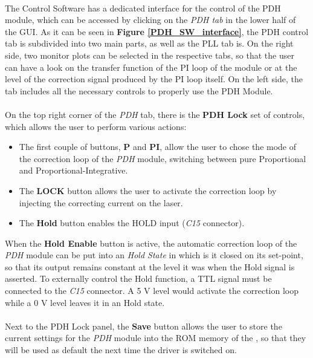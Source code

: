 \paragraph{} The \QubeModel  Control Software has a dedicated interface for the control of the PDH module, which can be accessed by clicking on the \textit{PDH tab} in the lower half of the GUI.
\newline As it can be seen in \textbf{Figure \ref{PDH_SW_interface}}, the PDH control tab is subdivided into two main parts, as well as the PLL tab is. On the right side, two monitor plots can be selected in the respective tabs, so that the user can have a look on the transfer function of the PI loop of the module or at the level of the correction signal produced by the PI loop itself.
\newline On the left side, the tab includes all the necessary controls to properly use the PDH Module.

\paragraph{} On the top right corner of the \textit{PDH} tab, there is the \textbf{PDH Lock} set of controls, which allows the user to perform various actions:
\begin{itemize}
    \item The first couple of buttons, \textbf{P} and \textbf{PI}, allow the user to chose the mode of the correction loop of the \textit{PDH} module, switching between pure Proportional and Proportional-Integrative.
    \item The \textbf{LOCK} button allows the user to activate the correction loop by injecting the correcting current on the laser.
    \item The \textbf{Hold} button enables the HOLD input (\textit{C15} connector). 
\end{itemize}

When the \textbf{Hold Enable} button is active, the automatic correction loop of the \textit{PDH} module can be put into an \textit{Hold State} in which is it closed on its set-point, so that its output remains constant at the level it was when the Hold signal is asserted. To externally control the Hold function, a TTL signal must be connected to the \textit{C15} connector. A 5 V level would activate the correction loop while a 0 V level leaves it in an Hold state.

\paragraph{} Next to the PDH Lock panel, the \textbf{Save} button allows the user to store the current settings for the \textit{PDH} module into the ROM memory of the \QubeModel , so that they will be used as default the next time the driver is switched on.

